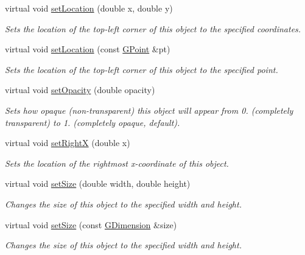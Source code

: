 \begin{DoxyCompactItemize}
virtual void \mbox{\hyperlink{classsgl_1_1GObject_a04594e8ba9b98513a64f1da00dcae18c}{set\+Location}} (double x, double y)
\begin{DoxyCompactList}\small\item\em Sets the location of the top-\/left corner of this object to the specified coordinates. \end{DoxyCompactList}\item 
virtual void \mbox{\hyperlink{classsgl_1_1GObject_aa8480c0b7166cdf8f784cece06ab353f}{set\+Location}} (const \mbox{\hyperlink{structsgl_1_1GPoint}{G\+Point}} \&pt)
\begin{DoxyCompactList}\small\item\em Sets the location of the top-\/left corner of this object to the specified point. \end{DoxyCompactList}\item 
virtual void \mbox{\hyperlink{classsgl_1_1GObject_a04af1866cc1bae4a1226695794a50539}{set\+Opacity}} (double opacity)
\begin{DoxyCompactList}\small\item\em Sets how opaque (non-\/transparent) this object will appear from 0. (completely transparent) to 1. (completely opaque, default). \end{DoxyCompactList}\item 
virtual void \mbox{\hyperlink{classsgl_1_1GObject_a3c90b758cdc2c911c9ef76c4360eb912}{set\+RightX}} (double x)
\begin{DoxyCompactList}\small\item\em Sets the location of the rightmost x-\/coordinate of this object. \end{DoxyCompactList}\item 
virtual void \mbox{\hyperlink{classsgl_1_1GObject_aca25d49481f9bf5fc8f7df4c086c4ce7}{set\+Size}} (double width, double height)
\begin{DoxyCompactList}\small\item\em Changes the size of this object to the specified width and height. \end{DoxyCompactList}\item 
virtual void \mbox{\hyperlink{classsgl_1_1GObject_ae2b628228f192c2702c4ce941b2af68f}{set\+Size}} (const \mbox{\hyperlink{structsgl_1_1GDimension}{G\+Dimension}} \&size)
\begin{DoxyCompactList}\small\item\em Changes the size of this object to the specified width and height. \end{DoxyCompactList}\item 

\end{DoxyCompactItemize}
